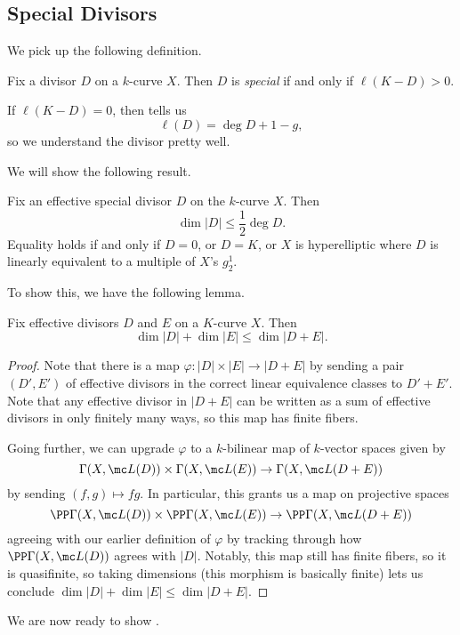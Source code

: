 \documentclass[../notes.tex]{subfiles}
\begin{document}
\subsection{Special Divisors}
We pick up the following definition.
\begin{definition}[special]
	Fix a divisor $D$ on a $k$-curve $X$. Then $D$ is \textit{special} if and only if $\ell(K-D)>0$.
\end{definition}
\begin{remark}
	If $\ell(K-D)=0$, then  tells us
	\[\ell(D)=\deg D+1-g,\]
	so we understand the divisor pretty well.
\end{remark}
We will show the following result.
\begin{theorem}[Clifford] \label{thm:clifford}
	Fix an effective special divisor $D$ on the $k$-curve $X$. Then
	\[\dim|D|\le\frac12\deg D.\]
	Equality holds if and only if $D=0$, or $D=K$, or $X$ is hyperelliptic where $D$ is linearly equivalent to a multiple of $X$'s $g^1_2$.
\end{theorem}
To show this, we have the following lemma.
\begin{lemma} \label{lem:add-divisors-dim}
	Fix effective divisors $D$ and $E$ on a $K$-curve $X$. Then
	\[\dim|D|+\dim|E|\le\dim|D+E|.\]
\end{lemma}
\begin{proof}
	Note that there is a map $\varphi\colon|D|\times|E|\to|D+E|$ by sending a pair $(D',E')$ of effective divisors in the correct linear equivalence classes to $D'+E'$. Note that any effective divisor in $|D+E|$ can be written as a sum of effective divisors in only finitely many ways, so this map has finite fibers.

	Going further, we can upgrade $\varphi$ to a $k$-bilinear map of $k$-vector spaces given by
	\[\Gamma(X,\mc L(D))\times\Gamma(X,\mc L(E))\to\Gamma(X,\mc L(D+E))\]
	by sending $(f,g)\mapsto fg$. In particular, this grants us a map on projective spaces
	\[\PP\Gamma(X,\mc L(D))\times\PP\Gamma(X,\mc L(E))\to\PP\Gamma(X,\mc L(D+E))\]
	agreeing with our earlier definition of $\varphi$ by tracking through how $\PP\Gamma(X,\mc L(D))$ agrees with $|D|$. Notably, this map still has finite fibers, so it is quasifinite, so taking dimensions (this morphism is basically finite) lets us conclude $\dim|D|+\dim|E|\le\dim|D+E|$.
\end{proof}
We are now ready to show .
\end{document}
